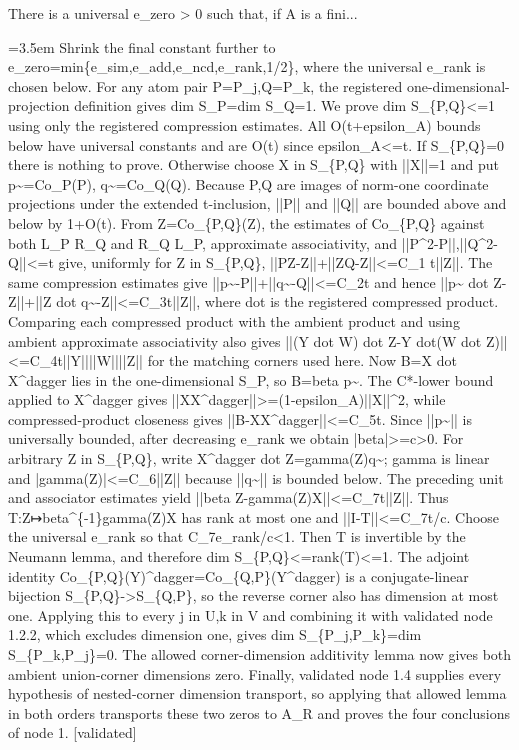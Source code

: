 \documentclass{article}
\newcommand{\step}[1]{\par\noindent\hangindent=3.5em\hangafter=1%
  \makebox[3.5em][l]{\textbf{#1.}}}
\newcommand{\steptag}[1]{\hfill{\small\textsf{[#1]}}}
\begin{document}
\begin{proofbox}{There is a universal e\_zero > 0 such that, if A is a fini...}
\step{1.6} Shrink the final constant further to e\_zero=min\{e\_sim,e\_add,e\_ncd,e\_rank,1/2\}, where the universal e\_rank is chosen below. For any atom pair P=P\_j,Q=P\_k, the registered one-dimensional-projection definition gives dim S\_P=dim S\_Q=1. We prove dim S\_\{P,Q\}<=1 using only the registered compression estimates. All O(t+epsilon\_A) bounds below have universal constants and are O(t) since epsilon\_A<=t. If S\_\{P,Q\}=0 there is nothing to prove. Otherwise choose X in S\_\{P,Q\} with ||X||=1 and put p\textasciitilde{}=Co\_P(P), q\textasciitilde{}=Co\_Q(Q). Because P,Q are images of norm-one coordinate projections under the extended t-inclusion, ||P|| and ||Q|| are bounded above and below by 1+O(t). From Z=Co\_\{P,Q\}(Z), the estimates of Co\_\{P,Q\} against both L\_P R\_Q and R\_Q L\_P, approximate associativity, and ||P\textasciicircum{}2-P||,||Q\textasciicircum{}2-Q||<=t give, uniformly for Z in S\_\{P,Q\}, ||PZ-Z||+||ZQ-Z||<=C\_1 t||Z||. The same compression estimates give ||p\textasciitilde{}-P||+||q\textasciitilde{}-Q||<=C\_2t and hence ||p\textasciitilde{} dot Z-Z||+||Z dot q\textasciitilde{}-Z||<=C\_3t||Z||, where dot is the registered compressed product. Comparing each compressed product with the ambient product and using ambient approximate associativity also gives ||(Y dot W) dot Z-Y dot(W dot Z)||<=C\_4t||Y||||W||||Z|| for the matching corners used here. Now B=X dot X\textasciicircum{}dagger lies in the one-dimensional S\_P, so B=beta p\textasciitilde{}. The C*-lower bound applied to X\textasciicircum{}dagger gives ||XX\textasciicircum{}dagger||>=(1-epsilon\_A)||X||\textasciicircum{}2, while compressed-product closeness gives ||B-XX\textasciicircum{}dagger||<=C\_5t. Since ||p\textasciitilde{}|| is universally bounded, after decreasing e\_rank we obtain |beta|>=c>0. For arbitrary Z in S\_\{P,Q\}, write X\textasciicircum{}dagger dot Z=gamma(Z)q\textasciitilde{}; gamma is linear and |gamma(Z)|<=C\_6||Z|| because ||q\textasciitilde{}|| is bounded below. The preceding unit and associator estimates yield ||beta Z-gamma(Z)X||<=C\_7t||Z||. Thus T:Z↦beta\textasciicircum{}\{-1\}gamma(Z)X has rank at most one and ||I-T||<=C\_7t/c. Choose the universal e\_rank so that C\_7e\_rank/c<1. Then T is invertible by the Neumann lemma, and therefore dim S\_\{P,Q\}<=rank(T)<=1. The adjoint identity Co\_\{P,Q\}(Y)\textasciicircum{}dagger=Co\_\{Q,P\}(Y\textasciicircum{}dagger) is a conjugate-linear bijection S\_\{P,Q\}->S\_\{Q,P\}, so the reverse corner also has dimension at most one. Applying this to every j in U,k in V and combining it with validated node 1.2.2, which excludes dimension one, gives dim S\_\{P\_j,P\_k\}=dim S\_\{P\_k,P\_j\}=0. The allowed corner-dimension additivity lemma now gives both ambient union-corner dimensions zero. Finally, validated node 1.4 supplies every hypothesis of nested-corner dimension transport, so applying that allowed lemma in both orders transports these two zeros to A\_R and proves the four conclusions of node 1. \steptag{validated} \\[4pt]
\end{proofbox}
\end{document}
